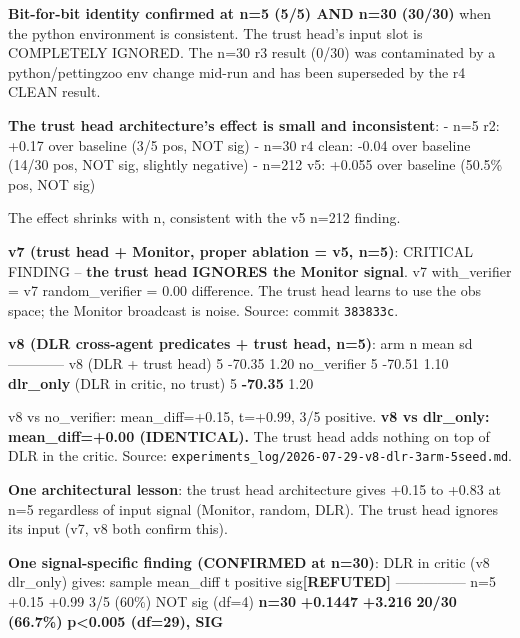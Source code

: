 \documentclass[
]{article}
\begin{document}
\textbf{Bit-for-bit identity confirmed at n=5 (5/5) AND n=30 (30/30)}
when the python environment is consistent. The trust head's input slot
is COMPLETELY IGNORED. The n=30 r3 result (0/30) was contaminated by a
python/pettingzoo env change mid-run and has been superseded by the r4
CLEAN result.

\textbf{The trust head architecture's effect is small and inconsistent}:
- n=5 r2: +0.17 over baseline (3/5 pos, NOT sig) - n=30 r4 clean: -0.04
over baseline (14/30 pos, NOT sig, slightly negative) - n=212 v5: +0.055
over baseline (50.5\% pos, NOT sig)

The effect shrinks with n, consistent with the v5 n=212 finding.

\textbf{v7 (trust head + Monitor, proper ablation = v5, n=5)}: CRITICAL
FINDING -- \textbf{the trust head IGNORES the Monitor signal}. v7
with\_verifier = v7 random\_verifier = 0.00 difference. The trust head
learns to use the obs space; the Monitor broadcast is noise. Source:
commit \texttt{383833c}.

\textbf{v8 (DLR cross-agent predicates + trust head, n=5)}: \textbar{}
arm \textbar{} n \textbar{} mean \textbar{} sd \textbar{}
\textbar---\textbar---\textbar---\textbar---\textbar{} \textbar{} v8
(DLR + trust head) \textbar{} 5 \textbar{} -70.35 \textbar{} 1.20
\textbar{} \textbar{} no\_verifier \textbar{} 5 \textbar{} -70.51
\textbar{} 1.10 \textbar{} \textbar{} \textbf{dlr\_only} (DLR in critic,
no trust) \textbar{} 5 \textbar{} \textbf{-70.35} \textbar{} 1.20
\textbar{}

v8 vs no\_verifier: mean\_diff=+0.15, t=+0.99, 3/5 positive. \textbf{v8
vs dlr\_only: mean\_diff=+0.00 (IDENTICAL).} The trust head adds nothing
on top of DLR in the critic. Source:
\texttt{experiments\_log/2026-07-29-v8-dlr-3arm-5seed.md}.

\textbf{One architectural lesson}: the trust head architecture gives
+0.15 to +0.83 at n=5 regardless of input signal (Monitor, random, DLR).
The trust head ignores its input (v7, v8 both confirm this).

\textbf{One signal-specific finding (CONFIRMED at n=30)}: DLR in critic
(v8 dlr\_only) gives: \textbar{} sample \textbar{} mean\_diff \textbar{}
t \textbar{} positive \textbar{} sig\textbf{{[}REFUTED{]}} \textbar{}
\textbar---\textbar---\textbar---\textbar---\textbar---\textbar{}
\textbar{} n=5 \textbar{} +0.15 \textbar{} +0.99 \textbar{} 3/5 (60\%)
\textbar{} NOT sig (df=4) \textbar{} \textbar{} \textbf{n=30} \textbar{}
\textbf{+0.1447} \textbar{} \textbf{+3.216} \textbar{} \textbf{20/30
(66.7\%)} \textbar{} \textbf{p\textless0.005 (df=29), SIG} \textbar{}
\end{document}
